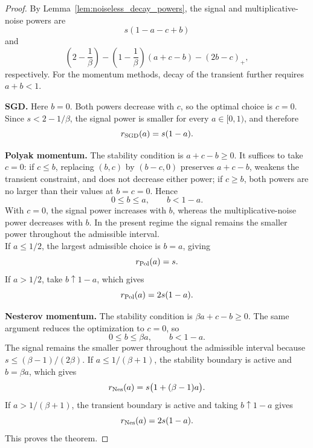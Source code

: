 \begin{proof}
By Lemma~\ref{lem:noiseless_decay_powers}, the signal and multiplicative-noise powers are
\[
s(1-a-c+b)
\]
and
\[
\left(2-\frac1\beta\right)
-\left(1-\frac1\beta\right)(a+c-b)
-(2b-c)_{+},
\]
respectively. For the momentum methods, decay of the transient further requires \(a+b<1\).

\medskip

\noindent\textbf{SGD.}
Here \(b=0\). Both powers decrease with \(c\), so the optimal choice is \(c=0\). Since \(s<2-1/\beta\), the signal power is smaller for every \(a\in[0,1)\), and therefore
\[
r_{\rm SGD}(a)=s(1-a).
\]

\medskip

\noindent\textbf{Polyak momentum.}
The stability condition is \(a+c-b\geq0\). It suffices to take \(c=0\): if \(c\leq b\), replacing \((b,c)\) by \((b-c,0)\) preserves \(a+c-b\), weakens the transient constraint, and does not decrease either power; if \(c\geq b\), both powers are no larger than their values at \(b=c=0\). Hence
\[
0\leq b\leq a,
\qquad
b<1-a.
\]
With \(c=0\), the signal power increases with \(b\), whereas the multiplicative-noise power decreases with \(b\). In the present regime the signal remains the smaller power throughout the admissible interval. \\
If \(a\leq1/2\), the largest admissible choice is \(b=a\), giving
\[
r_{\rm Pol}(a)=s.
\]
If \(a>1/2\), take \(b\uparrow1-a\), which gives
\[
r_{\rm Pol}(a)=2s(1-a).
\]

\medskip

\noindent\textbf{Nesterov momentum.}
The stability condition is \(\beta a+c-b\geq0\). The same argument reduces the optimization to \(c=0\), so
\[
0\leq b\leq\beta a,
\qquad
b<1-a.
\]
The signal remains the smaller power throughout the admissible interval because \(s\leq(\beta-1)/(2\beta)\). If \(a\leq1/(\beta+1)\), the stability boundary is active and \(b=\beta a\), which gives
\[
r_{\rm Nes}(a)=s\bigl(1+(\beta-1)a\bigr).
\]
If \(a>1/(\beta+1)\), the transient boundary is active and taking \(b\uparrow1-a\) gives
\[
r_{\rm Nes}(a)=2s(1-a).
\]
This proves the theorem.
\end{proof}

